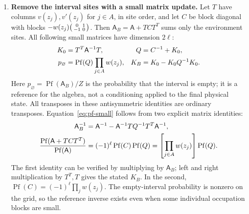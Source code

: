 \begin{enumerate}
\item \textbf{Remove the interval sites with a small matrix update.}
Let $T$ have columns $v(z_j),v'(z_j)$ for $j\in A$, in site order,
and let $C$ be block diagonal with blocks
$-w(z_j)\begin{psmallmatrix}0&1\\-1&0\end{psmallmatrix}$.
Then $\mathsf A_B=\mathsf A+TCT^T$ sums only the environment sites.
All following small matrices have dimension $2\ell$:
\begin{align}
 K_0&=T^T\mathsf A^{-1}T,& Q&=C^{-1}+K_0,\notag\\
 p_\varnothing&=\operatorname{Pf}(Q)\prod_{j\in A}w(z_j),&
 K_B&=K_0-K_0Q^{-1}K_0.
 \label{eq:pf-small}
\end{align}
Here $p_\varnothing=\operatorname{Pf}(\mathsf A_B)/Z$ is the probability
that the interval is empty; it is a reference for the algebra, not a
conditioning applied to the final physical state. All transposes in
these antisymmetric identities are ordinary transposes.
Equation~\eqref{eq:pf-small} follows from two explicit matrix identities:
\begin{align}
 \mathsf A_B^{-1}
 &=\mathsf A^{-1}-\mathsf A^{-1}TQ^{-1}T^T\mathsf A^{-1},\notag\\
 \frac{\operatorname{Pf}(\mathsf A+TCT^T)}{\operatorname{Pf}(\mathsf A)}
 &=(-1)^\ell\operatorname{Pf}(C)\operatorname{Pf}(Q)
 =\left[\prod_{j\in A}w(z_j)\right]\operatorname{Pf}(Q).
\end{align}
The first identity can be verified by multiplying by $\mathsf A_B$;
left and right multiplication by $T^T,T$ gives the stated $K_B$.
In the second, $\operatorname{Pf}(C)=(-1)^\ell\prod_jw(z_j)$.
The empty-interval probability is nonzero on the grid, so the reference
inverse exists even when some individual occupation blocks are small.


\end{enumerate}
